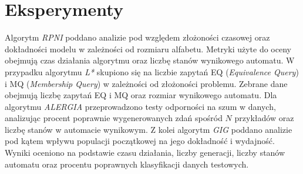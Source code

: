 \chapter{Eksperymenty}
\label{cha:eksperymenty}



Algorytm \textit{RPNI} poddano analizie pod względem złożoności czasowej oraz dokładności modelu w zależności od rozmiaru alfabetu. Metryki użyte do oceny obejmują czas działania algorytmu oraz liczbę stanów wynikowego automatu. W przypadku algorytmu \textit{L*} skupiono się na liczbie zapytań EQ (\textit{Equivalence Query}) i MQ (\textit{Membership Query}) w zależności od złożoności problemu. Zebrane dane obejmują liczbę zapytań EQ i MQ oraz rozmiar wynikowego automatu. Dla algorytmu \textit{ALERGIA} przeprowadzono testy odporności na szum w danych, analizując procent poprawnie wygenerowanych zdań spośród \( N \) przykładów oraz liczbę stanów w automacie wynikowym. Z kolei algorytm \textit{GIG} poddano analizie pod kątem wpływu populacji początkowej na jego dokładność i wydajność. Wyniki oceniono na podstawie czasu działania, liczby generacji, liczby stanów automatu oraz procentu poprawnych klasyfikacji danych testowych.



